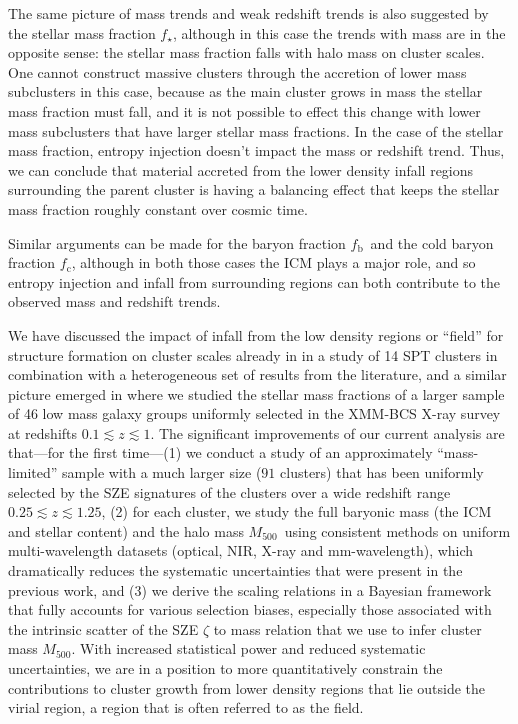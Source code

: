\documentclass[useAMS,usenatbib,iop,numberedappendix]{mn2e}
\newcommand{\Mfiveoo}{\ensuremath{M_{500}}}
\newcommand{\redshift}{\ensuremath{z}}
\newcommand{\fstar}{\ensuremath{f_{\star}}}
\newcommand{\fcold}{\ensuremath{f_{\mathrm{c}}}}
\newcommand{\fbary}{\ensuremath{f_{\mathrm{b}}}}
\begin{document}
The same picture of mass trends and weak redshift trends is also suggested by the stellar mass fraction \fstar, although in this case the trends with mass are in the opposite sense: the stellar mass fraction falls with halo mass on cluster scales.  One cannot construct massive clusters through the accretion of lower mass subclusters in this case, because as the main cluster grows in mass the stellar mass fraction must fall, and it is not possible to effect this change with lower mass subclusters that have larger stellar mass fractions.  In the case of the stellar mass fraction, entropy injection doesn't impact the mass or redshift trend.  Thus, we can conclude that material accreted from the lower density infall regions surrounding the parent cluster is having a balancing effect that keeps the stellar mass fraction roughly constant over cosmic time.  

Similar arguments can be made for the baryon fraction \fbary\ and the cold baryon fraction \fcold, although in both those cases the ICM plays a major role, and so entropy injection and infall from surrounding regions can both contribute to the observed mass and redshift trends.   

We have discussed the impact of infall from the low density regions or ``field'' for structure formation on cluster scales already in \cite{chiu16a} in a study of 14 SPT clusters in combination with a heterogeneous set of results from the literature, and a similar picture emerged in \cite{chiu16c} where we studied the stellar mass fractions of a larger sample of 46  low mass galaxy groups uniformly selected in the XMM-BCS X-ray survey \citep{suhada12,desai12} at redshifts $0.1\lesssim\redshift\lesssim1$.
The significant improvements of our current analysis are that---for the first time---(1) we conduct a study of an approximately ``mass-limited'' sample with a much larger size ($91$ clusters) that has been uniformly selected by the SZE signatures of the clusters over a wide redshift range $0.25\lesssim\redshift\lesssim1.25$, (2) for each cluster, we study the full baryonic mass (the ICM and stellar content) and the halo mass \Mfiveoo\ using consistent methods on uniform multi-wavelength datasets (optical, NIR, X-ray and mm-wavelength), which dramatically reduces the systematic uncertainties that were present in the previous work, and (3) we derive the scaling relations in a Bayesian framework that fully accounts for various selection biases, especially those associated with the intrinsic scatter of the SZE $\zeta$ to mass relation that we use to infer cluster mass \Mfiveoo.
With increased statistical power and reduced systematic uncertainties, we are in a position to more quantitatively constrain the contributions to cluster growth from lower density regions that lie outside the 
virial region, a region that is often referred to as the field.
\end{document}
